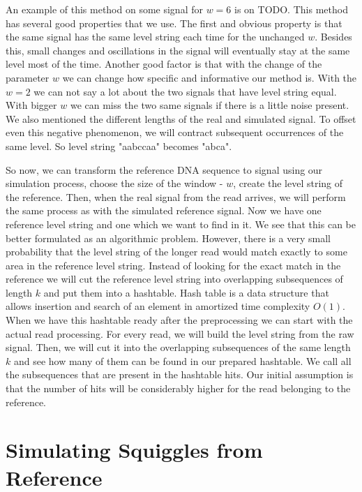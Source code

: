 
An example of this method on some signal for $w=6$ is on TODO. This method has
several good properties that we use. The first and obvious property is that the same signal has the
same level string each time for the unchanged $w$. Besides this, small changes and
oscillations in the signal will eventually stay at the same level most of the time.
Another good factor is that with the change of the parameter $w$ we can change how specific
and informative our method is. With the $w=2$ we can not say a lot about the two signals
that have level string equal. With bigger $w$ we can miss the two same signals
if there is a little noise present. We also mentioned the different lengths of
the real and simulated signal. To offset even this negative phenomenon, we will contract
subsequent occurrences of the same level. So level string "aabccaa" becomes "abca".

So now, we can transform the reference DNA sequence to signal using our simulation
process, choose the size of the window - $w$, create the level string of the reference.
Then, when the real signal from the read arrives, we will perform the same process
as with the simulated reference signal. Now we have one reference level string and
one which we want to find in it. We see that this can be better formulated as an
algorithmic problem. However, there is a very small probability that the level string
of the longer read would match exactly to some area in the reference level string.
Instead of looking for the exact match in the reference we will cut the reference
level string into overlapping subsequences of length $k$ and put them into a hashtable.
Hash table is a data structure that allows insertion and search of an element in
amortized time complexity $O(1)$. When we have this hashtable ready after the
preprocessing we can start with the actual read processing. For every read, we will
build the level string from the raw signal. Then, we will cut it into the overlapping
subsequences of the same length $k$ and see how many of them can be found in our
prepared hashtable. We call all the subsequences that are present in the hashtable
hits. Our initial assumption is that the number of hits will be considerably higher
for the read belonging to the reference.

\section{Simulating Squiggles from Reference}

